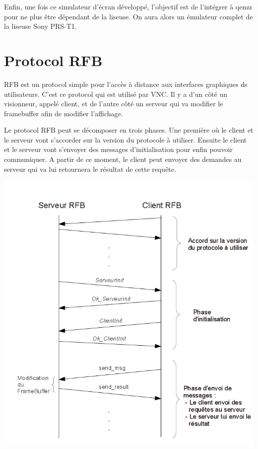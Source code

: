 Enfin, une fois ce simulateur d'écran développé, l'objectif est de l'intégrer à qemu pour ne plus être dépendant de la liseuse. On aura alors un émulateur complet de la liseuse Sony PRS-T1.


\section{Protocol RFB}

RFB est un protocol simple pour l'accès à distance aux interfaces graphiques ds utilisateurs. C'est ce protocol qui est utilisé par VNC. Il y a d'un côté un visionneur, appelé client, et de l'autre côté un serveur qui va modifier le framebuffer afin de modifier l'affichage.

Le protocol RFB peut se décomposer en trois phases. Une première où le client et le serveur vont s'accorder sur la version du protocole à utiliser. Ensuite le client et le serveur vont s'envoyer des messages d'initialisation pour enfin pouvoir communiquer. A partir de ce moment, le client peut envoyer des demandes au serveur qui va lui retournera le résultat de cette requête.

\begin{center}
	\includegraphics[scale=0.6]{RFBProtocol.png}
\end{center}
